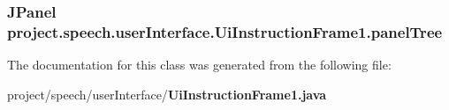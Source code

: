 \subsubsection[{panel\+Tree}]{\setlength{\rightskip}{0pt plus 5cm}J\+Panel project.\+speech.\+user\+Interface.\+Ui\+Instruction\+Frame1.\+panel\+Tree\hspace{0.3cm}{\ttfamily [private]}}\label{classproject_1_1speech_1_1user_interface_1_1_ui_instruction_frame1_a602ed08e80d737c5d95412b4f2cb311e}


The documentation for this class was generated from the following file\+:\begin{DoxyCompactItemize}
\item 
project/speech/user\+Interface/{\bf Ui\+Instruction\+Frame1.\+java}\end{DoxyCompactItemize}
